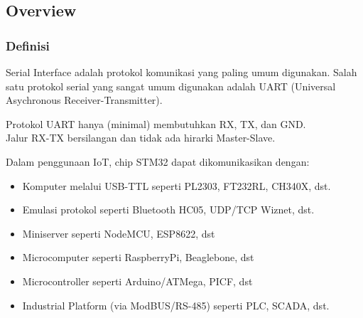 \documentclass[table,dvipsnames]{beamer}
\begin{document}
	\subsection{Overview}
	\begin{frame}
		\frametitle{Definisi}
		\begin{exampleblock}{}
			Serial Interface adalah protokol komunikasi yang paling umum digunakan.
			Salah satu protokol serial yang sangat umum digunakan adalah UART (Universal Asychronous Receiver-Transmitter).
		\end{exampleblock}

		\begin{exampleblock}{}
			Protokol UART hanya (minimal) membutuhkan RX, TX, dan GND.\\
			Jalur RX-TX bersilangan dan tidak ada hirarki Master-Slave.
		\end{exampleblock}

		\begin{exampleblock}{}
			Dalam penggunaan IoT, chip STM32 dapat dikomunikasikan dengan:
			\begin{itemize}
				\item Komputer melalui USB-TTL seperti PL2303, FT232RL, CH340X, dst.
				\item Emulasi protokol seperti Bluetooth HC05, UDP/TCP Wiznet, dst.
				\item Miniserver seperti NodeMCU, ESP8622, dst
				\item Microcomputer seperti RaspberryPi, Beaglebone, dst
				\item Microcontroller seperti Arduino/ATMega, PICF, dst
				\item Industrial Platform (via ModBUS/RS-485) seperti PLC, SCADA, dst.
			\end{itemize}
		\end{exampleblock}
	\end{frame}
\end{document}
